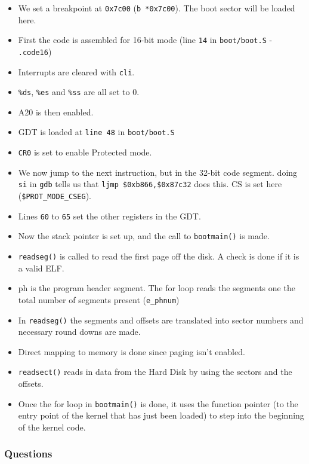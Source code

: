 \documentclass[]{article}
\begin{document}
\begin{itemize}
\itemsep1pt\parskip0pt
\item
  We set a breakpoint at \texttt{0x7c00} (\texttt{b *0x7c00}). The boot
  sector will be loaded here.
\item
  First the code is assembled for 16-bit mode (line \texttt{14} in
  \texttt{boot/boot.S} - \texttt{.code16})
\item
  Interrupts are cleared with \texttt{cli}.
\item
  \texttt{\%ds}, \texttt{\%es} and \texttt{\%ss} are all set to 0.
\item
  A20 is then enabled.
\item
  GDT is loaded at \texttt{line 48} in \texttt{boot/boot.S}
\item
  \texttt{CR0} is set to enable Protected mode.
\item
  We now jump to the next instruction, but in the 32-bit code segment.
  doing \texttt{si} in \texttt{gdb} tells us that
  \texttt{ljmp \$0xb866,\$0x87c32} does this. CS is set here
  (\texttt{\$PROT\_MODE\_CSEG}).
\item
  Lines \texttt{60} to \texttt{65} set the other registers in the GDT.
\item
  Now the stack pointer is set up, and the call to \texttt{bootmain()}
  is made.
\item
  \texttt{readseg()} is called to read the first page off the disk. A
  check is done if it is a valid ELF.
\item
  ph is the program header segment. The for loop reads the segments one
  the total number of segments present (\texttt{e\_phnum})
\item
  In \texttt{readseg()} the segments and offsets are translated into
  sector numbers and necessary round downs are made.
\item
  Direct mapping to memory is done since paging isn't enabled.
\item
  \texttt{readsect()} reads in data from the Hard Disk by using the
  sectors and the offsets.
\item
  Once the for loop in \texttt{bootmain()} is done, it uses the function
  pointer (to the entry point of the kernel that has just been loaded)
  to step into the beginning of the kernel code.
\end{itemize}

\subsubsection{Questions}
\end{document}
